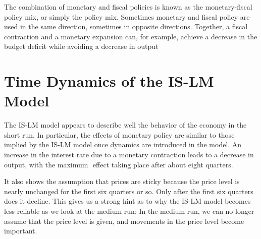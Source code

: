 \documentclass{extarticle}
\begin{document}
The combination of monetary and fiscal policies is known as the monetary-fiscal policy mix, or simply the policy mix. Sometimes monetary and fiscal policy are used in the same direction, sometimes in opposite directions. Together, a fiscal contraction and a monetary expansion can, for example, achieve a decrease in the budget deficit while avoiding a decrease in output
\section{Time Dynamics of the IS-LM Model}
The IS-LM model appears to describe well the behavior of the economy in the short run. In particular, the effects of monetary policy are similar to those implied by the IS-LM model once dynamics are introduced in the model. An increase in the interest rate due to a monetary contraction leads to a decrease in output, with the maximum ­ effect taking place after about eight quarters. 

It also shows the assumption that prices are sticky because the price level is nearly unchanged
for the first six quarters or so. Only after the first six quarters does it decline. This
gives us a strong hint as to why the IS-LM model becomes less reliable as we look at
the medium run: In the medium run, we can no longer assume that the price level is
given, and movements in the price level become important.
\end{document}
